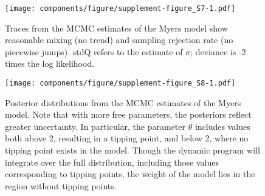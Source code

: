 \documentclass[]{components/elsarticle}
\begin{document}
\begin{figure}[htbp]
\centering
\texttt{[image: components/figure/supplement-figure\_S7-1.pdf]}
\caption{Traces from the MCMC estimates of the Myers model show
reasonable mixing (no trend) and sampling rejection rate (no piecewise
jumps). stdQ refers to the estimate of $\sigma$; deviance is -2 times
the log likelihood.}
\end{figure}

\begin{figure}[htbp]
\centering
\texttt{[image: components/figure/supplement-figure\_S8-1.pdf]}
\caption{Posterior distributions from the MCMC estimates of the Myers
model. Note that with more free parameters, the posteriors reflect
greater uncertainty. In particular, the parameter $\theta$ includes
values both above 2, resulting in a tipping point, and below 2, where no
tipping point exists in the model. Though the dynamic program will
integrate over the full distribution, including those values
corresponding to tipping points, the weight of the model lies in the
region without tipping points.}
\end{figure}
\end{document}

